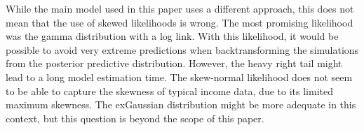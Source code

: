 While the main model used in this paper uses a different approach, this does not mean that the use of skewed likelihoods is wrong.
The most promising likelihood was the gamma distribution with a log link.
With this likelihood, it would be possible to avoid very extreme predictions when backtransforming the simulations from the posterior predictive distribution.
However, the heavy right tail might lead to a long model estimation time.
The skew-normal likelihood does not seem to be able to capture the skewness of typical income data, due to its limited maximum skewness.
The exGaussian distribution might be more adequate in this context, but this question is beyond the scope of this paper.


